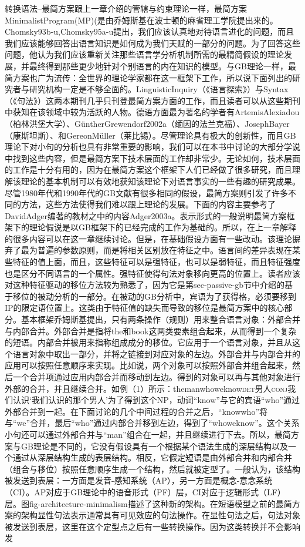 转换语法--最简方案跟上一章介绍的管辖与约束理论一样，最简方案MinimalistProgram(MP)(是由乔姆斯基在波士顿的麻省理工学院提出来的。Chomsky93b-u,Chomsky95a-u提出，我们应该认真地对待语言进化的问题，而且我们应该能够回答出语言知识是如何成为我们天赋的一部分的问题。为了回答这些问题，他认为我们应该重新关注那些语言学分析机制所需的最精简假设的理论发展，并最终得到那些更少地针对个别语言的内在知识的模型。与GB理论一样，最简方案也广为流传：全世界的理论学家都在这一框架下工作，所以说下面列出的研究者与研究机构一定是不够全面的。LinguisticInquiry（《语言探索》）与Syntax（《句法》）这两本期刊几乎只刊登最简方案方面的工作，而且读者可以从这些期刊中获知在该领域中较为活跃的人物。德语方面最为著名的学者有ArtemisAlexiadou（柏林洪堡大学）、GüntherGrewendorf2002a（缅因的法兰克福）、JosephBayer（康斯坦斯）、和GereonMüller（莱比锡）。尽管理论具有极大的创新性，而且GB理论下对小句的分析也具有非常重要的影响，我们可以在本书中讨论的大部分学说中找到这些内容，但是最简方案下技术层面的工作却非常少。无论如何，技术层面的工作是十分有用的，因为在最简方案这个框架下人们已经做了很多研究，而且理解该理论的基本机制可以有效地获知该理论下对语言事实的一些有趣的研究成果。尽管1980年代和1990年代的GB文献有很多相同的假设，最简方案则引发了许多不同的方法，这些方法使得我们难以跟上理论的发展。下面的内容主要参考了DavidAdger编著的教材之中的内容Adger2003a。表示形式的一般说明最简方案框架下的理论假说是以GB框架下的已经完成的工作为基础的。所以，在上一章解释的很多内容可以在这一章继续讨论。但是，在基础假设方面有一些改动。该理论摒弃了最为普遍的参数原则，而是将相关区别放在特征之中。语言间的差异表现在某些特征的值上面，而且，这些特征可以是强特征，也可以是弱特征，而且特征强度也是区分不同语言的一个属性。强特征使得句法对象移向更高的位置上。读者应该对这种特征驱动的移位方法较为熟悉了，因为它是第sec-passive-gb节中介绍的基于移位的被动分析的一部分。在被动的GB分析中，宾语为了获得格，必须要移到IP的限定语位置上。这类由于特征值的缺失而导致的移位是最简方案中的核心部分。基本框架乔姆斯基提出，只有两条操作（规则）用来整合语言对象：外部合并与内部合并。外部合并是指将the和book这两类要素组合起来，从而得到一个复杂的短语。内部合并被用来指称组成成分的移位。它应用于一个语言对象，并且从这个语言对象中取出一部分，并将之链接到对应对象的左边。外部合并与内部合并的应用可以按照任意顺序来实现。比如说，两个对象可以按照外部合并组合起来，然后一个合并项通过应用内部合并而移动到左边。得到的对象可以再与其他对象进行外部的合并，并且继续合并。如例（1）所示：themanwhoweknow\textsc{det}男人\textsc{conj}我们认识`我们认识的那个男人'为了得到这个NP，动词“know”与它的宾语“who”通过外部合并到一起。在下面讨论的几个中间过程的合并之后，“knowwho”将与“we”合并，最后“who”通过内部合并移到左边，得到了“whoweknow”。这个关系小句还可以通过外部合并与“man”组合在一起，并且继续进行下去。所以，最简方案与GB理论是不同的，它没有假设具有一个根据某个语法生成的深层结构以及一个通过从深层结构生成的表层结构。相反，它假定短语是由外部合并和内部合并（组合与移位）按照任意顺序生成一个结构，然后就被定型了。一般认为，该结构被发送到表层：一方面是发音-感知系统（AP），另一方面是概念-意念系统（CI）。AP对应于GB理论中的语音形式（PF）层，CI对应于逻辑形式（LF）层。图fig-architecture-minimalism描述了这种新的架构。在短语模型之前的最简方案的架构显性句法表示通常具有可见效应的句法操作。在显性句法之后，句法对象被发送到表层，这里在这个定型点之后有一些转换操作。因为这类转换并不会影响发